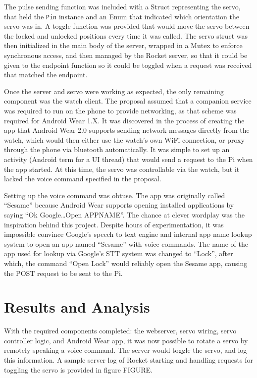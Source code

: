 \documentclass[a4paper]{article}
\begin{document}
The pulse sending function was included with a Struct representing the servo, that held the \texttt{Pin} instance and an Enum that indicated which orientation the servo was in.
A toggle function was provided that would move the servo between the locked and unlocked positions every time it was called.
The servo struct was then initialized in the main body of the server, wrapped in a Mutex to enforce synchronous access, and then managed by the Rocket server, so that it could be given to the endpoint function so it could be toggled when a request was received that matched the endpoint.


Once the server and servo were working as expected, the only remaining component was the watch client.
The proposal assumed that a companion service was required to run on the phone to provide networking, as that scheme was required for Android Wear 1.X.
It was discovered in the process of creating the app that Android Wear 2.0 supports sending network messages directly from the watch, which would then either use the watch's own WiFi connection, or proxy through the phone via bluetooth automatically.
It was simple to set up an activity (Android term for a UI thread) that would send a request to the Pi when the app started.
At this time, the servo was controllable via the watch, but it lacked the voice command specified in the proposal.

Setting up the voice command was obtuse.
The app was originally called ``Sesame'' because Android Wear supports opening installed applications by saying ``Ok Google\ldots Open APPNAME''.
The chance at clever wordplay was the inspiration behind this project.
Despite hours of experimentation, it was impossible convince Google's speech to text engine and internal app name lookup system to open an app named ``Sesame'' with voice commands.
The name of the app used for lookup via Google's STT system was changed to ``Lock'', after which, the command ``Open Lock'' would reliably open the Sesame app, causing the POST request to be sent to the Pi.


\section{Results and Analysis}\label{sec:resultsAndAnalysis}
With the required components completed: the webserver, servo wiring, servo controller logic, and Android Wear app, it was now possible to rotate a servo by remotely speaking a voice command.
The server would toggle the servo, and log this information.
A sample server log of Rocket starting and handling requests for toggling the servo is provided in figure FIGURE.
\end{document}
